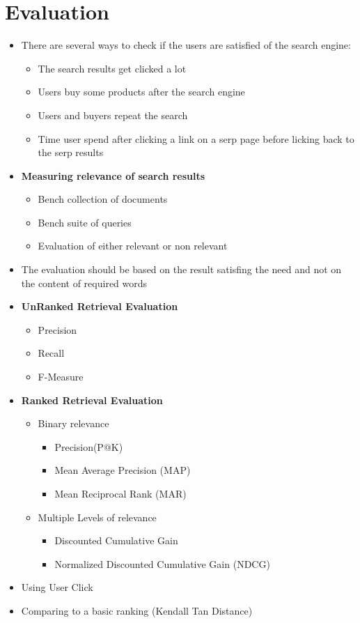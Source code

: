 \chapter{Evaluation}
\begin{itemize}
    \item There are several ways to check if the users are satisfied of the search engine:
    \begin{itemize}
        \item The search results get clicked a lot
        \item Users buy some products after the search engine
        \item Users and buyers repeat the search
        \item Time user spend after clicking a link on a serp page before licking back to the serp results
    \end{itemize}
    \item \textbf{Measuring relevance of search results}
    \begin{itemize}
        \item Bench collection of documents
        \item Bench suite of queries
        \item Evaluation of either relevant or non relevant
    \end{itemize}
    \item The evaluation should be based on the result satisfing the need and not on the content of required words
    \item \textbf{UnRanked Retrieval Evaluation}
    \begin{itemize}
        \item Precision
        \item Recall
        \item F-Measure
    \end{itemize}
    \item \textbf{Ranked Retrieval Evaluation}
    \begin{itemize}
        \item Binary relevance
        \begin{itemize}
            \item Precision(P@K)
            \item Mean Average Precision (MAP)
            \item Mean Reciprocal Rank (MAR)
        \end{itemize}
        \item Multiple Levels of relevance
        \begin{itemize}
            \item Discounted Cumulative Gain
            \item Normalized Discounted Cumulative Gain (NDCG)
        \end{itemize}
    \end{itemize}
    \item Using User Click
    \item Comparing to a basic ranking (Kendall Tan Distance)
\end{itemize}

